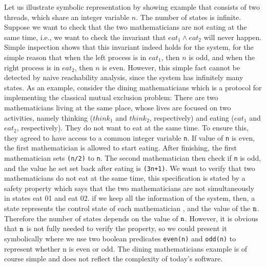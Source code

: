 
Let us illustrate symbolic representation by showing example that consists of two threads, which share an integer variable
$n$. The number of
states is infinite. Suppose we want to check that the two
mathematicians are not eating at the same time, i.e., we want to
check the invariant that
$eat_1 \land eat_2$ will never happen. Simple inspection shows that this invariant indeed holds
for the system, for the simple reason that
when the left process is in $eat_1$, then $n$ is odd, and
when the right process is in $eat_2$, then $n$ is even.
However, this simple fact cannot be detected by naive reachability analysis,
since the system has infinitely many states. As an example, consider the dining mathematicians which is a protocol for implementing the classical mutual exclusion problem: There are two mathematicians living at the same place, whose lives are focused on two activities, namely thinking ($think_1$ and $think_2$, respectively) and eating ($eat_1$ and $eat_2$, respectively). They do not want to eat at the same time. To ensure this, they agreed to have access to a common integer variable {\tt n}. If value of {\tt n} is even, the first mathematician is allowed to start eating. After finishing, the first mathematician sets {\tt (n/2)} to {\tt n}. The second mathematician then check if {\tt n} is odd, and the value he set set back after eating is {\tt (3n+1)}. 
We want to verify that two mathematicians do not eat at the same time, this specification is stated by a safety property which says that the two mathematicians are not simultaneously in states eat 01 and eat 02. 
if we keep all the information of the system, then, a state represents the control state of each mathematician
, and the value of the $\tt n$. Therefore the number of states depends on the value of $\tt n$. 
However, it is obvious that $\tt n$ is not fully needed to verify the property, so we could present it symbolically where we use two boolean predicates {\tt even(n)} and {\tt odd(n)} to represent  whether n is even or odd. The dining mathematicians example is of course simple and does not reflect the complexity of today’s software.  
